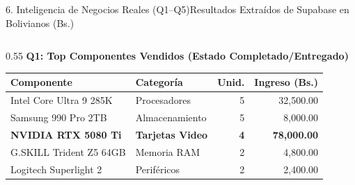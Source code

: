\documentclass[aspectratio=169,10pt]{beamer}
\begin{document}
\begin{frame}{6. Inteligencia de Negocios Reales (Q1--Q5)}{Resultados Extra\'idos de Supabase en Bolivianos (Bs.)}
  \begin{columns}[T,totalwidth=\textwidth]
    \begin{column}{0.55\textwidth}
      {\scriptsize\textbf{\color{updsNavy}Q1: Top Componentes Vendidos (Estado Completado/Entregado)}}\\[1.5mm]
      {\scriptsize
      \setlength{\tabcolsep}{3.5pt}
      \renewcommand{\arraystretch}{1.12}
      \begin{tabular}{@{}l l r r@{}}
        \toprule
        \textbf{Componente} & \textbf{Categor\'ia} & \textbf{Unid.} & \textbf{Ingreso (Bs.)} \\
        \midrule
        Intel Core Ultra 9 285K & Procesadores & 5 & 32,500.00 \\
        Samsung 990 Pro 2TB & Almacenamiento & 5 & 8,000.00 \\
        \textbf{NVIDIA RTX 5080 Ti} & \textbf{Tarjetas Video} & \textbf{4} & \textbf{78,000.00} \\
        G.SKILL Trident Z5 64GB & Memoria RAM & 2 & 4,800.00 \\
        Logitech Superlight 2 & Perif\'ericos & 2 & 2,400.00 \\
        \bottomrule
      \end{tabular}}


\end{column}
\end{columns}
\end{frame}
\end{document}
